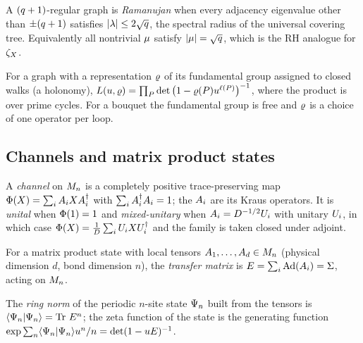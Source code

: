 \begin{definition}
\label{def:ramanujan-graph}
A $(q+1)$-regular graph is \emph{Ramanujan} when every adjacency eigenvalue
other than $\pm(q+1)$ satisfies $|\lambda|\le2\sqrt{q}$, the spectral
radius of the universal covering tree. Equivalently all nontrivial $\mu$
satisfy $|\mu| = \sqrt{q}$, which is the RH analogue for $\zeta_{X}$.
\end{definition}

\begin{definition}
\label{def:artin-ihara}
For a graph with a representation $\varrho$ of its fundamental group assigned
to closed walks (a holonomy), $L(u,\varrho) =
\prod_{P}\det\big(1-\varrho(P)u^{\ell(P)}\big)^{-1}$, where the
product is over prime cycles. For a bouquet the fundamental group is free and
$\varrho$ is a choice of one operator per loop.
\end{definition}

\subsection{Channels and matrix product states}

\begin{definition}
\label{def:channel}
A \emph{channel} on $M_n$ is a completely positive trace-preserving map
$\Phi(X) = \sum_iA_{i}XA_{i}^\dagger$ with $\sum_iA_{i}^\dagger A_{i} =
1$; the $A_{i}$ are its Kraus operators. It is \emph{unital} when
$\Phi(1) = 1$ and \emph{mixed-unitary} when $A_{i} = D^{-1/2}U_{i}$ with
unitary $U_{i}$, in which case $\Phi(X) = \frac1{D}\sum_iU_{i}X
U_{i}^\dagger$ and the family is taken closed under adjoint.
\end{definition}

\begin{definition}
\label{def:transfer-matrix}
For a matrix product state with local tensors $A_{1},\dots,A_{d}\in M_n$
(physical dimension $d$, bond dimension $n$), the \emph{transfer matrix} is
$E = \sum_i\operatorname{Ad}(A_{i}) = \Sigma$, acting on $M_n$.
\end{definition}

\begin{definition}
\label{def:ring-norm}
The \emph{ring norm} of the periodic $n$-site state $\Psi_{n}$ built from the
tensors is $\langle\Psi_{n}|\Psi_{n}\rangle = \operatorname{Tr}\,E^{n}$; the zeta function of the state is
the generating function $\exp\sum_n\langle\Psi_{n}|\Psi_{n}\rangle u^n/n = \det(1-uE)^{-1}$.
\end{definition}

